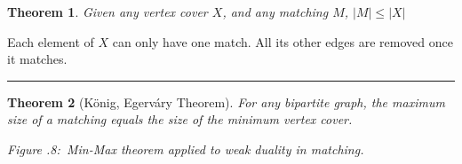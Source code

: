 \documentclass[twoside]{article}
\newcounter{lecnum}
\newcommand{\fig}[3]{
      \vspace{#2}
      \begin{center}
      Figure \thelecnum.#1:~#3
      \end{center}
  }
\newtheorem{theorem}{Theorem}[lecnum]
\newenvironment{proof}{{\bf Proof:}}{\hfill\rule{2mm}{2mm}}
\begin{document}
\begin{theorem}
Given any vertex cover $X$, and any matching $M$, $|M| \leq |X|$
\end{theorem}
\begin{proof}
Each element of $X$ can only have one match. All its other edges are removed once it matches.
\end{proof}
\begin{theorem}[K\"onig, Egerv\'ary Theorem]

For any bipartite graph, the maximum size of a matching equals the size of the minimum vertex cover.\\
\begin{center}
\end{center}
\fig{8}{0in}{Min-Max theorem applied to weak duality in matching.}
\end{theorem}
\end{document}
